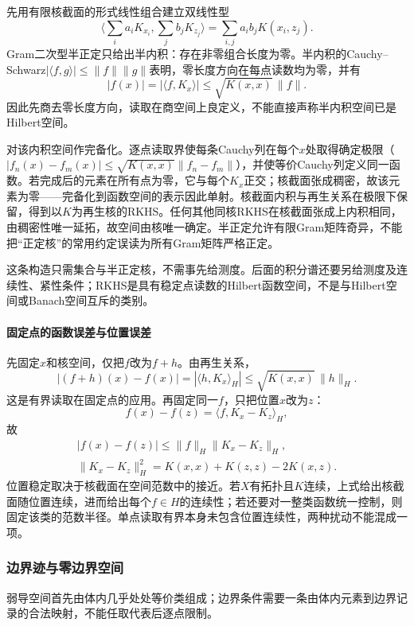 先用有限核截面的形式线性组合建立双线性型
\[
\Big\langle\sum_i a_iK_{x_i},\sum_jb_jK_{z_j}\Big\rangle
=\sum_{i,j}a_ib_jK(x_i,z_j).
\]
Gram二次型半正定只给出半内积：存在非零组合长度为零。半内积的Cauchy–Schwarz$|\langle f,g\rangle|\le\|f\|\|g\|$表明，零长度方向在每点读数均为零，并有
\[
|f(x)|=|\langle f,K_x\rangle|\le\sqrt{K(x,x)}\,\|f\|.
\]
因此先商去零长度方向，读取在商空间上良定义，不能直接声称半内积空间已是Hilbert空间。

对该内积空间作完备化。逐点读取界使每条Cauchy列在每个$x$处取得确定极限（$|f_n(x)-f_m(x)|\le\sqrt{K(x,x)}\|f_n-f_m\|$），并使等价Cauchy列定义同一函数。若完成后的元素在所有点为零，它与每个$K_x$正交；核截面张成稠密，故该元素为零——完备化到函数空间的表示因此单射。核截面内积与再生关系在极限下保留，得到以$K$为再生核的RKHS。任何其他同核RKHS在核截面张成上内积相同，由稠密性唯一延拓，故空间由核唯一确定。半正定允许有限Gram矩阵奇异，不能把“正定核”的常用约定误读为所有Gram矩阵严格正定。

这条构造只需集合与半正定核，不需事先给测度。后面的积分谱还要另给测度及连续性、紧性条件；RKHS是具有稳定点读数的Hilbert函数空间，不是与Hilbert空间或Banach空间互斥的类别。

\paragraph{固定点的函数误差与位置误差}

先固定$x$和核空间，仅把$f$改为$f+h$。由再生关系，
\begin{equation}
\label{eq:functional-rkhs-error-fixedpoint}
|(f+h)(x)-f(x)|=|\langle h,K_x\rangle_H|
\le\sqrt{K(x,x)}\,\|h\|_H.
\end{equation}
这是有界读取在固定点的应用。再固定同一$f$，只把位置$x$改为$z$：
\[
f(x)-f(z)=\langle f,K_x-K_z\rangle_H,
\]
故
\[
\begin{aligned}
|f(x)-f(z)|\le\|f\|_H\|K_x-K_z\|_H,\\
\|K_x-K_z\|_H^2=K(x,x)+K(z,z)-2K(x,z).
\end{aligned}
\]
位置稳定取决于核截面在空间范数中的接近。若$X$有拓扑且$K$连续，上式给出核截面随位置连续，进而给出每个$f\in H$的连续性；若还要对一整类函数统一控制，则固定该类的范数半径。单点读取有界本身未包含位置连续性，两种扰动不能混成一项。

\subsubsection{边界迹与零边界空间}
\label{subsubsec:trace-zero-boundary}

弱导空间首先由体内几乎处处等价类组成；边界条件需要一条由体内元素到边界记录的合法映射，不能任取代表后逐点限制。

